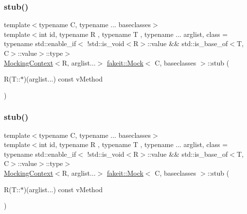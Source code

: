 \mbox{\label{classfakeit_1_1Mock_a7a8f38b58b068b35f263eee42d75c162}} 
\subsubsection{\texorpdfstring{stub()}{stub()}\hspace{0.1cm}{\footnotesize\ttfamily [11/72]}}
{\footnotesize\ttfamily template$<$typename C, typename ... baseclasses$>$ \\
template$<$int id, typename R , typename T , typename ... arglist, class  = typename std\+::enable\+\_\+if$<$                !std\+::is\+\_\+void$<$\+R$>$\+::value \&\& std\+::is\+\_\+base\+\_\+of$<$\+T, C$>$\+::value$>$\+::type$>$ \\
\mbox{\hyperlink{classfakeit_1_1MockingContext}{Mocking\+Context}}$<$R, arglist...$>$ \mbox{\hyperlink{classfakeit_1_1Mock}{fakeit\+::\+Mock}}$<$ C, baseclasses $>$\+::stub (\begin{DoxyParamCaption}\item[{R(T\+::$\ast$)(arglist...) const}]{v\+Method }\end{DoxyParamCaption})\hspace{0.3cm}{\ttfamily [inline]}}

\mbox{\label{classfakeit_1_1Mock_a7a8f38b58b068b35f263eee42d75c162}} 
\subsubsection{\texorpdfstring{stub()}{stub()}\hspace{0.1cm}{\footnotesize\ttfamily [12/72]}}
{\footnotesize\ttfamily template$<$typename C, typename ... baseclasses$>$ \\
template$<$int id, typename R , typename T , typename ... arglist, class  = typename std\+::enable\+\_\+if$<$                !std\+::is\+\_\+void$<$\+R$>$\+::value \&\& std\+::is\+\_\+base\+\_\+of$<$\+T, C$>$\+::value$>$\+::type$>$ \\
\mbox{\hyperlink{classfakeit_1_1MockingContext}{Mocking\+Context}}$<$R, arglist...$>$ \mbox{\hyperlink{classfakeit_1_1Mock}{fakeit\+::\+Mock}}$<$ C, baseclasses $>$\+::stub (\begin{DoxyParamCaption}\item[{R(T\+::$\ast$)(arglist...) const}]{v\+Method }\end{DoxyParamCaption})\hspace{0.3cm}{\ttfamily [inline]}}

